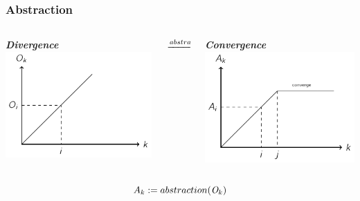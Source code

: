 \documentclass[aspectratio=169]{beamer}
\begin{document}
\begin{frame}
  \frametitle{Abstraction}
  \begin{block}{}%
    \begin{columns}
      \begin{column}{0.45\textwidth}
        \begin{center}{\scriptsize  \textbf{\textit{Divergence}}}
          \includegraphics[width=1\textwidth]{figures/diverge}
        \end{center}
      \end{column}
      \begin{column}{0.12\textwidth}
        \begin{center}
          \alert{$\xrightarrow[]{\small{abstraction}}$}
        \end{center}
      \end{column}
      \begin{column}{0.45\textwidth}
        \begin{center}{\scriptsize \textbf{\textit{Convergence}}}
          \includegraphics[width=1\textwidth]{figures/stutter-free}
        \end{center}
      \end{column}
    \end{columns}
  \end{block}
    \[
      A_k := abstraction(\observation[k])
      \]
\end{frame}
\end{document}
